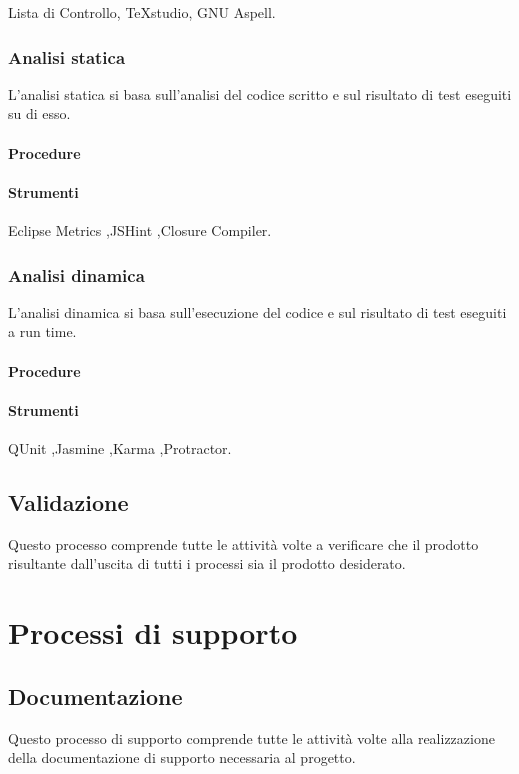 Lista di Controllo, TeXstudio, GNU Aspell.


\subsubsection{Analisi statica}
L'analisi statica si basa sull'analisi del codice scritto e sul risultato di test eseguiti su di esso.

\paragraph{Procedure}

\paragraph{Strumenti}
Eclipse Metrics ,JSHint ,Closure Compiler.

\subsubsection{Analisi dinamica}
L'analisi dinamica si basa sull'esecuzione del codice e sul risultato di test eseguiti a run time.
\paragraph{Procedure}

\paragraph{Strumenti}
QUnit ,Jasmine ,Karma ,Protractor.




\subsection{Validazione}
Questo processo comprende tutte le attività volte a verificare che il prodotto risultante dall'uscita di tutti i processi sia il prodotto desiderato.

\section{Processi di supporto}


\subsection{Documentazione}
Questo processo di supporto comprende tutte le attività volte alla realizzazione della documentazione di supporto necessaria al progetto.

